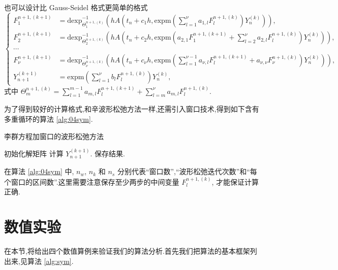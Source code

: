 也可以设计比 Gauss-Seidel 格式更简单的格式
\begin{equation*}
	\left\lbrace\begin{aligned}
		F_1^{n+1,(k+1)}&=\mbox{dexp}_{\Theta_1^{n+1,(k)}}^{-1}(hA(t_n+c_1h,\mbox{expm}(\sum_{l=1}^{\nu}a_{1,l}F_l^{n+1,(k)})Y_n^{(k)})),\\
		F_2^{n+1,(k+1)}&=\mbox{dexp}_{\Theta_2^{n+1,(k)}}^{-1}(hA(t_n+c_2h,\mbox{expm}(a_{2,1}F_1^{n+1,(k+1)}+\sum_{l=2}^{\nu}a_{2,l}F_l^{n+1,(k)})Y_n^{(k)})),\\
		\cdots \\
		F_{\nu}^{n+1,(k+1)}&=\mbox{dexp}_{\Theta_{\nu}^{n+1,(k)}}^{-1}(hA(t_n+c_{\nu}h,\mbox{expm}(\sum_{l=1}^{\nu-1}a_{\nu,l}F_{l}^{n+1,(k+1)}+a_{\nu,\nu}F_{\nu}^{n+1,(k)})Y_n^{(k)})),\\
		Y_{n+1}^{(k+1)}&=\mbox{expm}(\sum_{l=1}^{\nu}b_lF_l^{n+1,(k)})Y_n^{(k)},
	\end{aligned}\right.
\end{equation*}
式中 $\Theta_m^{n+1,(k)} = \sum_{l=1}^{m-1}a_{m,l}F_{l}^{n+1,(k+1)}+\sum_{l=m}^{\nu}a_{m,l}F_l^{n+1,(k)}$.

为了得到较好的计算格式,和辛波形松弛方法一样,还需引入窗口技术,得到如下含有多重循环的算法 \ref{alg:04sym}.

\begin{algorithm}
\caption{李群方程加窗口的波形松弛方法}
\label{alg:04sym}
\begin{algorithmic}
\STATE 初始化解矩阵
             \STATE 计算 $Y_{n+1}^{(k+1)}$.
        \ENDFOR
    \ENDFOR
\ENDFOR
\STATE 保存结果.
\end{algorithmic}
\end{algorithm}
在算法 \ref{alg:04sym} 中, $n_w$, $n_k$ 和 $n_s$ 分别代表``窗口数'',``波形松弛迭代次数''和``每个窗口的区间数''.这里需要注意保存至少两步的中间变量 $F_l^{n+1,(k)}$, 才能保证计算正确.

\section{数值实验}\label{sec:03numerical}
在本节,将给出四个数值算例来验证我们的算法分析.首先我们把算法的基本框架列出来,见算法 \ref{alg:sym}.

